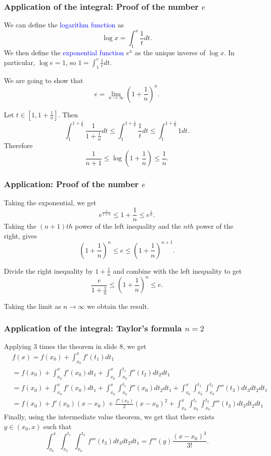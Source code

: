 \documentclass[11pt,aspectratio=169]{beamer}
\begin{document}
\begin{frame}
\frametitle{Application of the  integral: Proof of the number $e$}
\begin{small}
We can define the \textcolor{blue}{ logarithm function} as
$$
\log x =\int_1^x \frac{1}{t} dt.
$$
We then  define the  \textcolor{blue}{exponential function} $e^x$ as the unique inverse of $\log x$. In particular, $\log e=1$, so $1=\int_1^e \frac{1}{t} dt$.

We are  going to show that $$e=\lim_{n \rightarrow \infty} \left(1+\frac{1}{n} \right)^n.$$

Let  $t \in [1, 1+\frac1n]$. Then
$$
\int_1^{1+\frac1n} \frac{1}{1+\frac1n} dt \leq \int_1^{1+\frac1n} \frac{1}{t} dt \leq \int_1^{1+\frac1n} 1 dt.
$$
Therefore
$$
\frac{1}{n+1} \leq  \log \left(1+\frac1n \right) \leq \frac1n.
$$


\end{small}
\end{frame}


\begin{frame}
\frametitle{Application: Proof of the number $e$}
\begin{small}
 Taking the  exponential, we get
$$
e^{\frac{1}{1+n}} \leq 1+\frac1n \leq e^{\frac1n}.
$$
Taking the  $(n+1)th$ power of the  left inequality and the  $nth$ power of the  right, gives
$$
\left(1+\frac{1}{n} \right)^n \leq e \leq \left(1+\frac{1}{n} \right)^{n+1}.
$$

 Divide the  right  inequality by  $1+\frac1n$ and combine with the left inequality  to get
$$
\frac{e}{1+\frac{1}{n} }\leq \left(1+\frac{1}{n} \right)^n \leq e.
$$

Taking the limit as $n \rightarrow \infty$ we obtain the result.


\end{small}
\end{frame}

\begin{frame}
\frametitle{Application of the  integral: Taylor's formula $n=2$}
\begin{small}
Applying 3 times the theorem in slide 8, we get
\begin{equation*} \begin{split}
&f(x)=f(x_0)+\int_{x_0}^x f'(t_1) dt_1 \\
&=f(x_0)+\int_{x_0}^x f'(x_0) dt_1+\int_{x_0}^x \int_{x_0}^{t_1} f''(t_2) dt_2 dt_1 \\
&=f(x_0)+\int_{x_0}^x f'(x_0) dt_1+\int_{x_0}^x \int_{x_0}^{t_1} f''(x_0) dt_2 dt_1 +\int_{x_0}^x \int_{x_0}^{t_1} \int_{x_0}^{t_2} f'''(t_3) dt_3  dt_2 dt_1\\
&=f(x_0) +f'(x_0)(x-x_0)+\frac{f''(x_0)}{2}(x-x_0)^2
+\int_{x_0}^x \int_{x_0}^{t_1} \int_{x_0}^{t_2} f'''(t_3) dt_3  dt_2 dt_1
\end{split}
\end{equation*}
Finally, using the intermediate value theorem, we get that there exists $y \in (x_0, x)$ such that
$$
\int_{x_0}^x \int_{x_0}^{t_1} \int_{x_0}^{t_2} f'''(t_3) dt_3  dt_2 dt_1=f'''(y) \frac{(x-x_0)^3}{3!}.
$$
\end{small}
\end{frame}
\end{document}
